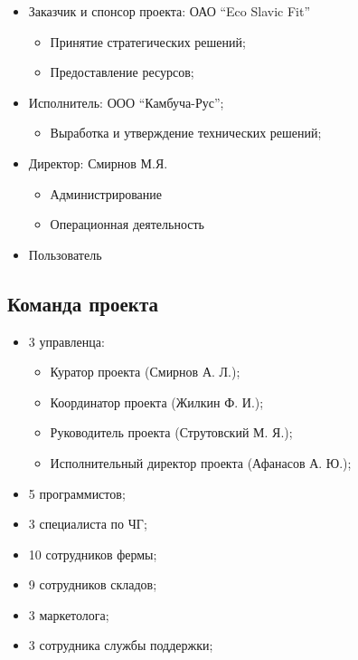 \documentclass[a4paper,10pt]{article}
\begin{document}
    \begin{itemize}
        \item Заказчик и спонсор проекта: ОАО ``Eco Slavic Fit''
            \begin{itemize}
                \item Принятие стратегических решений;
                \item Предоставление ресурсов;
            \end{itemize}
        \item Исполнитель: ООО ``Камбуча-Рус'';
            \begin{itemize}
                \item Выработка и утверждение технических решений;
            \end{itemize}
        \item Директор: Смирнов М.Я.
            \begin{itemize}
                \item Администрирование
                \item Операционная деятельность
            \end{itemize}
        \item Пользователь
    \end{itemize}

\subsection{Команда проекта}

    \begin{itemize}
        \item 3 управленца:
            \begin{itemize}
                \item Куратор проекта (Смирнов А. Л.);
                \item Координатор проекта (Жилкин Ф. И.);
                \item Руководитель проекта (Струтовский М. Я.);
                \item Исполнительный директор проекта (Афанасов А. Ю.);
            \end{itemize}
        \item 5 программистов;
        \item 3 специалиста по ЧГ;
        \item 10 сотрудников фермы;
        \item 9 сотрудников складов;
        \item 3 маркетолога;
        \item 3 сотрудника службы поддержки;
    \end{itemize}
\end{document}
